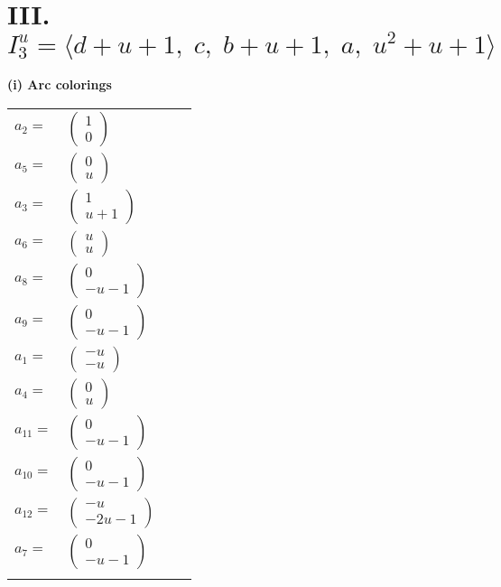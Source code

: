 \documentclass[1p]{elsarticle_modified}
\theoremstyle{definition}
\begin{document}
\centering \section*{III. $I^u_{3}= \langle d+u+1,\;c,\;b+u+1,\;a,\;u^2+u+1 \rangle$}
\flushleft \textbf{(i) Arc colorings}\\
\begin{tabular}{m{7pt} m{180pt} m{7pt} m{180pt} }
\flushright $a_{2}=$&$\begin{pmatrix}1\\0\end{pmatrix}$ \\
\flushright $a_{5}=$&$\begin{pmatrix}0\\u\end{pmatrix}$ \\
\flushright $a_{3}=$&$\begin{pmatrix}1\\u+1\end{pmatrix}$ \\
\flushright $a_{6}=$&$\begin{pmatrix}u\\u\end{pmatrix}$ \\
\flushright $a_{8}=$&$\begin{pmatrix}0\\- u-1\end{pmatrix}$ \\
\flushright $a_{9}=$&$\begin{pmatrix}0\\- u-1\end{pmatrix}$ \\
\flushright $a_{1}=$&$\begin{pmatrix}- u\\- u\end{pmatrix}$ \\
\flushright $a_{4}=$&$\begin{pmatrix}0\\u\end{pmatrix}$ \\
\flushright $a_{11}=$&$\begin{pmatrix}0\\- u-1\end{pmatrix}$ \\
\flushright $a_{10}=$&$\begin{pmatrix}0\\- u-1\end{pmatrix}$ \\
\flushright $a_{12}=$&$\begin{pmatrix}- u\\-2 u-1\end{pmatrix}$ \\
\flushright $a_{7}=$&$\begin{pmatrix}0\\- u-1\end{pmatrix}$\\&\end{tabular}
\end{document}
